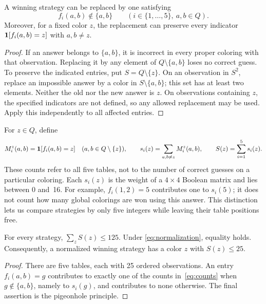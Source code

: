 \begin{lemma}\label{lem:normalization}
A winning strategy can be replaced by one satisfying
\begin{equation}\label{eq:normalization}
f_i(a,b)\notin\{a,b\}
\qquad(i\in\{1,\ldots,5\},\ a,b\in Q).
\end{equation}
Moreover, for a fixed color $z$, the replacement can preserve every
indicator $\mathbf{1}[f_i(a,b)=z]$ with $a,b\ne z$.
\end{lemma}
\begin{proof}
If an answer belongs to $\{a,b\}$, it is incorrect in every proper coloring
with that observation. Replacing it by any element of
$Q\setminus\{a,b\}$ loses no correct guess. To preserve the indicated
entries, put $S=Q\setminus\{z\}$. On an observation in $S^2$, replace an
impossible answer by a color in $S\setminus\{a,b\}$; this set has at least
two elements. Neither the old nor the new answer is $z$. On observations
containing $z$, the specified indicators are not defined, so any allowed
replacement may be used. Apply this independently to all affected entries.
\end{proof}

For $z\in Q$, define
\begin{equation}\label{eq:counts}
M_i^z(a,b)=\mathbf{1}[f_i(a,b)=z]\quad(a,b\in Q\setminus\{z\}),\qquad
s_i(z)=\sum_{a,b\ne z}M_i^z(a,b),\qquad
S(z)=\sum_{i=1}^5s_i(z).
\end{equation}
These counts refer to all five tables, not to the number of correct guesses
on a particular coloring. Each $s_i(z)$ is the weight of a $4\times4$
Boolean matrix and lies between 0 and~16.
For example, $f_i(1,2)=5$ contributes one to $s_i(5)$; it does not
count how many global colorings are won using this answer. This distinction
lets us compare strategies by only five integers while leaving their
table positions free.

\begin{lemma}\label{lem:total}
For every strategy, $\sum_zS(z)\leq125$. Under
\eqref{eq:normalization}, equality holds. Consequently, a normalized
winning strategy has a color $z$ with $S(z)\leq25$.
\end{lemma}
\begin{proof}
There are five tables, each with 25 ordered observations. An entry
$f_i(a,b)=g$ contributes to exactly one of the counts in~\eqref{eq:counts}
when $g\notin\{a,b\}$, namely to $s_i(g)$, and contributes to none
otherwise. The final assertion is the pigeonhole principle.
\end{proof}

